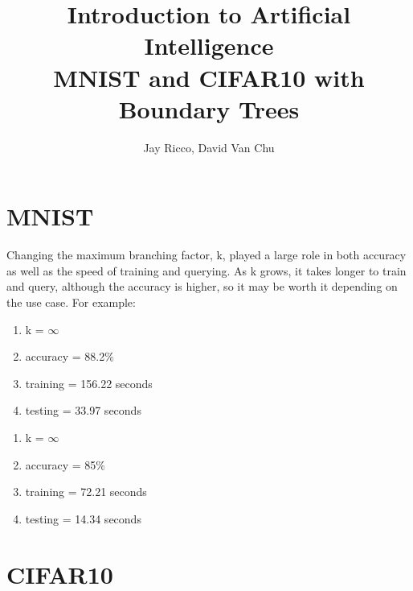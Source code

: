 \documentclass[10pt,letterpaper]{article}
\author{Jay Ricco, David Van Chu}
\title{Introduction to Artificial Intelligence\\MNIST and CIFAR10 with Boundary Trees}
\begin{document}
	\maketitle
	\section{MNIST}
		Changing the maximum branching factor, k, played a large role in both accuracy as well as the speed of training and querying. As k grows, it takes longer to train and query, although the accuracy is higher, so it may be worth it depending on the use case.
		For example:
		\begin{enumerate}
			\item k = $\infty$
			\item accuracy = 88.2$\%$
			\item training = 156.22 seconds
			\item testing = 33.97 seconds
		\end{enumerate}
	
		\begin{enumerate}
			\item k = $\infty$
			\item accuracy = 85$\%$
			\item training = 72.21 seconds
			\item testing = 14.34 seconds
		\end{enumerate}
	\section{CIFAR10}
		
\end{document}
